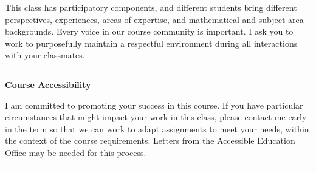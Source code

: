 \documentclass[12pt,letterpaper]{exam}
\begin{document}
This class has participatory components, and different students bring different perspectives, experiences, areas of expertise, and mathematical and subject area backgrounds.  Every voice in our course community is important.  I ask you to work to purposefully maintain a respectful environment during all interactions with your classmates.


\vspace{0.5cm}
\hrule
\vspace{0.5cm}

\noindent\textbf{Course Accessibility}

I am committed to promoting your success in this course.  If you have particular circumstances that might impact your work in this class, please contact me early in the term so that we can work to adapt assignments to meet your needs, within the context of the course requirements.  Letters from the Accessible Education Office may be needed for this process.






\vspace{0.5cm}
\hrule
\vspace{0.5cm}
\end{document}
